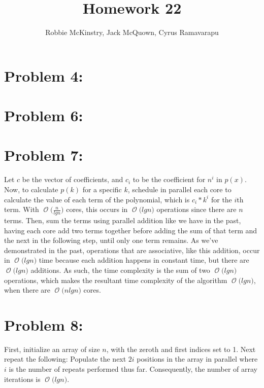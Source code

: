 \documentclass[12pt]{article}
\newcommand{\BigO}[1]{\ensuremath{\operatorname{\mathcal{O}}\bigl(#1\bigr)}}
\begin{document}
\title{Homework 22}
\author{Robbie McKinstry, Jack McQuown, Cyrus Ramavarapu}
\renewcommand{\today}{24 October 2016}
\renewcommand{\baselinestretch}{1.5}
\maketitle

\section*{Problem 4: }
\section*{Problem 6: }
\section*{Problem 7: }

Let $c$ be the vector of coefficients, and $c_i$ to be the coefficient for $n^{i}$ in $p(x)$. Now, to calculate $p(k)$ for a specific $k$, schedule in parallel each core to calculate the value of each term of the polynomial, which is $c_{i}*k^{i}$ for the $i$th term. With \BigO{\frac{n}{lg n}} cores, this occurs in \BigO{lg n} operations since there are $n$ terms. Then, sum the terms using parallel addition like we have in the past, having each core add two terms together before adding the sum of that term and the next in the following step, until only one term remains. As we've demonstrated in the past, operations that are associative, like this addition, occur in \BigO{lg n} time because each addition happens in constant time, but there are \BigO{lg n} additions. As such, the time complexity is the sum of two \BigO{lg n} operations, which makes the resultant time complexity of the algorithm \BigO{lg n}, when there are \BigO{n lg n} cores.

\section*{Problem 8: }

First, initialize an array of size $n$, with the zeroth and first indices set to 1. Next repeat the following: Populate the next $2i$ positions in the array in parallel where $i$ is the number of repeats performed thus far. Consequently, the number of array iterations is \BigO{lg n}. 
\end{document}
